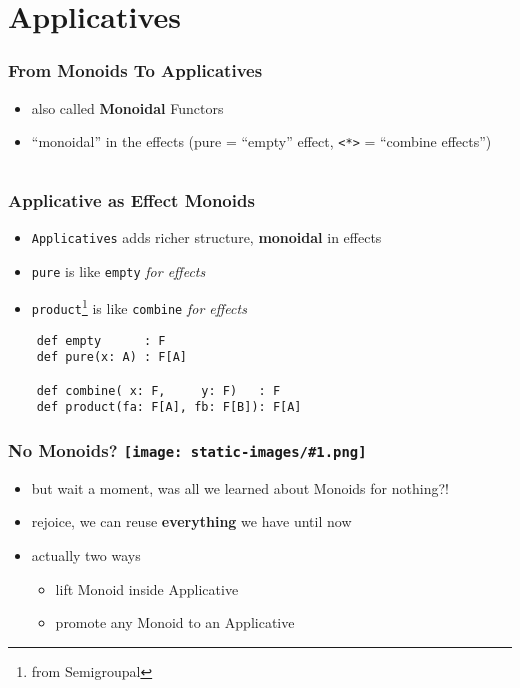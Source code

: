 \documentclass[aspectratio=169]{beamer}
\newcommand{\emoji}[1]{
  \texttt{[image: static-images/\#1.png]}
}
\begin{document}
\section{Applicatives}\label{sec:applicatives}

\begin{frame}[fragile]
  \frametitle{From Monoids To Applicatives}
  \begin{itemize}
  \item also called \textbf{Monoidal} Functors
  \item ``monoidal'' in the effects (pure = ``empty'' effect, \texttt{<*>} = ``combine effects'')
  \end{itemize}
  \vfill
  \inputminted[fontsize=\small]{scala}{snippets/applicative-def.scala}
\end{frame}

\begin{frame}[fragile]
  \frametitle{Applicative as Effect Monoids}
  \begin{itemize}
  \item \texttt{Applicatives} adds richer structure, \textbf{monoidal} in effects
  \item \texttt{pure} is like \texttt{empty} \textit{for effects}
  \item \texttt{product}\footnote{from Semigroupal} is like \texttt{combine} \textit{for effects}
  \end{itemize}
  \begin{verbatim}
    def empty      : F
    def pure(x: A) : F[A]

    def combine( x: F,     y: F)   : F
    def product(fa: F[A], fb: F[B]): F[A]
  \end{verbatim}
\end{frame}

\begin{frame}
  \frametitle{No Monoids? \emoji{scream}}
  \begin{itemize}
  \item but wait a moment, was all we learned about Monoids for nothing?!
  \item rejoice, we can reuse \textbf{everything} we have until now
  \item actually two ways
    \begin{itemize}
    \item lift Monoid inside Applicative
    \item promote any Monoid to an Applicative
    \end{itemize}
  \end{itemize}
\end{frame}
\end{document}
